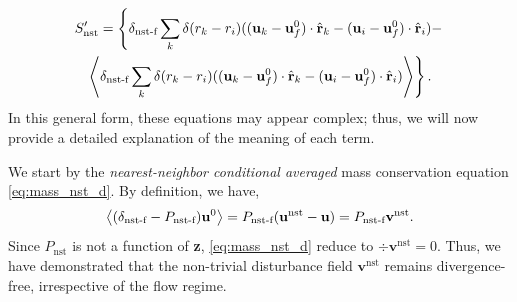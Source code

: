\begin{multline}
    S_\text{nst}'
    =
    \left\{
    \delta_\text{nst-f}
        \sum_k 
        \delta(r_k - r_i)
        ((\textbf{u}_k - \textbf{u}_f^0) \cdot \hat{\textbf{r}}_k - (\textbf{u}_i  - \textbf{u}_f^0)\cdot \hat{\textbf{r}}_i) 
    - \right.\\ \left.
    \left<
         \delta_\text{nst-f}
        \sum_k 
        \delta(r_k - r_i)
        ((\textbf{u}_k - \textbf{u}_f^0) \cdot \hat{\textbf{r}}_k - (\textbf{u}_i  - \textbf{u}_f^0)\cdot \hat{\textbf{r}}_i) 
    \right>
    \right\}. 
\end{multline}
In this general form, these equations may appear complex; thus, we will now provide a detailed explanation of the meaning of each term.

We start by the \textit{nearest-neighbor conditional averaged} mass conservation equation \eqref{eq:mass_nst_d}. 
By definition, we have, 
\begin{equation}
    \left<(\delta_\text{nst-f} - P_\text{nst-f} )\textbf{u}^0\right>
    = P_\text{nst-f} (\textbf{u}^\text{nst} - \textbf{u})
    = P_\text{nst-f} \textbf{v}^\text{nst}. 
\end{equation}
Since $P_\text{nst}$ is not a function of \textbf{z}, \ref{eq:mass_nst_d} reduce to $\div\textbf{v}^\text{nst}=0$.
Thus, we have demonstrated that the non-trivial disturbance field $\textbf{v}^\text{nst}$ remains divergence-free, irrespective of the flow regime.

